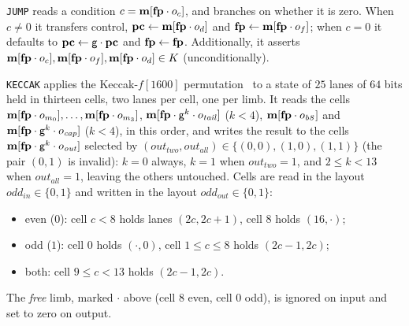 \vspace{5mm}


\texttt{JUMP} reads a condition $c=\mathbf{m}[\mathbf{fp}\cdot o_c]$, and branches on whether it is zero. When $c\neq0$ it transfers control, $\mathbf{pc}\gets\mathbf{m}[\mathbf{fp}\cdot o_d]$ and $\mathbf{fp}\gets\mathbf{m}[\mathbf{fp}\cdot o_f]$; when $c=0$ it defaults to $\mathbf{pc}\gets\mathsf{g}\cdot\mathbf{pc}$ and $\mathbf{fp}\gets\mathbf{fp}$. Additionally, it asserts $\mathbf{m}[\mathbf{fp}\cdot o_c],\mathbf{m}[\mathbf{fp}\cdot o_f], \mathbf{m}[\mathbf{fp}\cdot o_d] \in K$ (unconditionally).

\vspace{5mm}

\texttt{KECCAK} applies the Keccak-$f[1600]$ permutation~\cite{keccak} to a state of $25$ lanes of $64$ bits held in thirteen cells, two lanes per cell, one per limb. It reads the cells $\mathbf{m}[\mathbf{fp}\cdot o_{m_0}],\dots,\mathbf{m}[\mathbf{fp}\cdot o_{m_3}]$, $\mathbf{m}[\mathbf{fp}\cdot \mathsf{g}^k\cdot o_{\mathit{tail}}]$ ($k<4$), $\mathbf{m}[\mathbf{fp}\cdot o_{\mathit{b8}}]$ and $\mathbf{m}[\mathbf{fp}\cdot \mathsf{g}^k\cdot o_{\mathit{cap}}]$ ($k<4$), in this order, and writes the result to the cells $\mathbf{m}[\mathbf{fp}\cdot \mathsf{g}^k\cdot o_{\mathit{out}}]$ selected by $(\mathit{out}_{\mathit{two}},\mathit{out}_{\mathit{all}})\in\{(0,0),(1,0),(1,1)\}$ (the pair $(0,1)$ is invalid): $k=0$ always, $k=1$ when $\mathit{out}_{\mathit{two}}=1$, and $2\le k<13$ when $\mathit{out}_{\mathit{all}}=1$, leaving the others untouched. Cells are read in the layout $\mathit{odd}_{\mathit{in}}\in\{0,1\}$ and written in the layout $\mathit{odd}_{\mathit{out}}\in\{0,1\}$:
\begin{itemize}
\item even ($0$): cell $c<8$ holds lanes $(2c,2c+1)$, cell $8$ holds $(16,\cdot)$;
\item odd ($1$): cell $0$ holds $(\cdot,0)$, cell $1\le c\le8$ holds $(2c-1,2c)$;
\item both: cell $9\le c<13$ holds $(2c-1,2c)$.
\end{itemize}
The \emph{free} limb, marked $\cdot$ above (cell $8$ even, cell $0$ odd), is ignored on input and set to zero on output.


